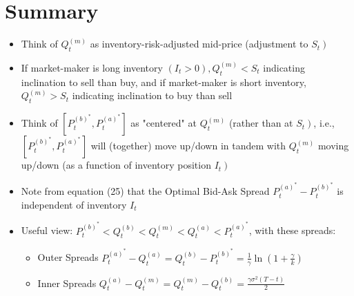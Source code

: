 \documentclass[10pt]{article}
\begin{document}
\section{Summary}

\begin{itemize} 
    \item Think of $Q_{t}^{(m)}$ as inventory-risk-adjusted mid-price (adjustment to $\left.S_{t}\right)$
    \item If market-maker is long inventory $\left(I_{t}>0\right), Q_{t}^{(m)}<S_{t}$ indicating inclination to sell than buy, and if market-maker is short inventory, $Q_{t}^{(m)}>S_{t}$ indicating inclination to buy than sell
    \item Think of $\left[P_{t}^{(b)^{*}}, P_{t}^{(a)^{*}}\right]$ as "centered" at $Q_{t}^{(m)}$ (rather than at $\left.S_{t}\right)$,
    i.e., $\left[P_{t}^{(b)^{*}}, P_{t}^{(a)^{*}}\right]$ will (together) move up/down in tandem with $Q_{t}^{(m)}$ moving up/down (as a function of inventory position $\left.I_{t}\right)$
    \item Note from equation (25) that the Optimal Bid-Ask Spread $P_{t}^{(a)^{*}}-P_{t}^{(b)^{*}}$ is independent of inventory $I_{t}$
    \item Useful view: $P_{t}^{(b)^{*}}<Q_{t}^{(b)}<Q_{t}^{(m)}<Q_{t}^{(a)}<P_{t}^{(a)^{*}}$, with these spreads:
    \begin{itemize} 
        \item Outer Spreads $P_{t}^{(a)^{*}}-Q_{t}^{(a)}=Q_{t}^{(b)}-P_{t}^{(b)^{*}}=\frac{1}{\gamma} \ln \left(1+\frac{\gamma}{k}\right)$
        \item Inner Spreads $Q_{t}^{(a)}-Q_{t}^{(m)}=Q_{t}^{(m)}-Q_{t}^{(b)}=\frac{\gamma \sigma^{2}(T-t)}{2}$
    \end{itemize}
\end{itemize}


           

\end{document}
